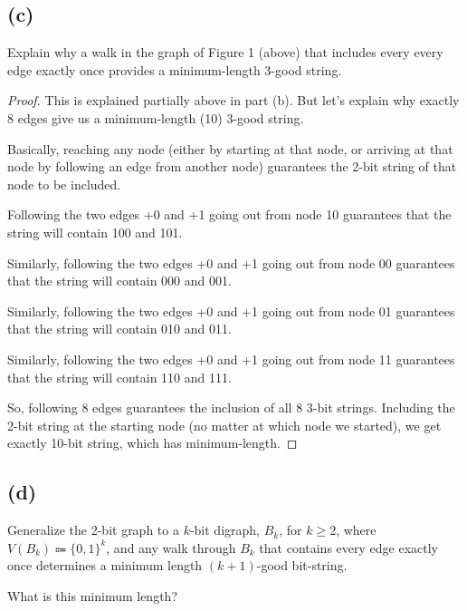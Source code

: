 \documentclass[14pt]{extarticle}
\begin{document}
\subsection{(c)}
Explain why a walk in the graph of Figure 1 (above) that includes every every edge exactly once provides a minimum-length 3-good string.
\begin{proof}
This is explained partially above in part (b). But let's explain why exactly 8 edges give us a minimum-length (10) 3-good string.

Basically, reaching any node (either by starting at that node, or arriving at that node by following an edge from another node) guarantees the 2-bit string of that node to be included.

Following the two edges +0 and +1 going out from node 10 guarantees that the string will contain 100 and 101.

Similarly, following the two edges +0 and +1 going out from node 00 guarantees that the string will contain 000 and 001.

Similarly, following the two edges +0 and +1 going out from node 01 guarantees that the string will contain 010 and 011.

Similarly, following the two edges +0 and +1 going out from node 11 guarantees that the string will contain 110 and 111.

So, following 8 edges guarantees the inclusion of all 8 3-bit strings. Including the 2-bit string at the starting node (no matter at which node we started), we get exactly 10-bit string, which has minimum-length.
\end{proof}

\subsection{(d)}
Generalize the 2-bit graph to a $k$-bit digraph, $B_k$, for $k \geq 2$, where $V(B_k) \Coloneqq \{0,1\}^k$, and any walk through $B_k$ that contains every edge exactly once determines a minimum length $(k + 1)$-good bit-string.

What is this minimum length?
\end{document}
